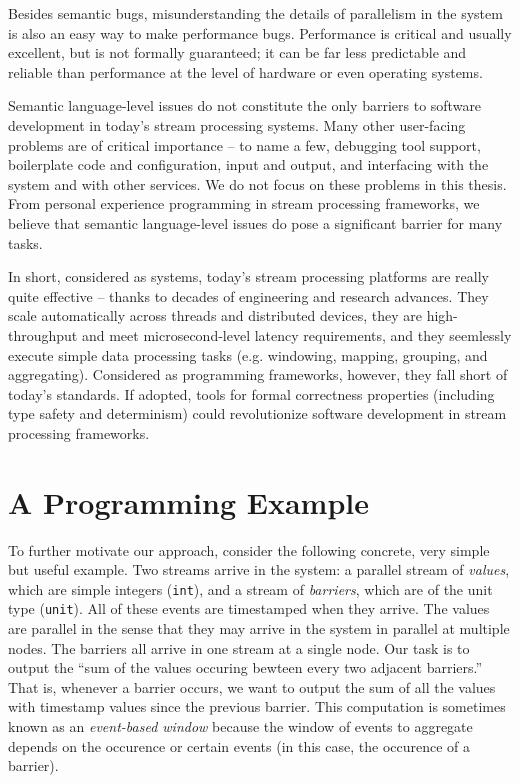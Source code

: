 Besides semantic bugs, misunderstanding the details of parallelism in the system is also an easy way to make performance bugs. Performance is critical and usually excellent, but is not formally guaranteed; it can be far less predictable and reliable than performance at the level of hardware or even operating systems.

Semantic language-level issues do not constitute the only barriers to software development in today's stream processing systems. Many other user-facing problems are of critical importance -- to name a few, debugging tool support, boilerplate code and configuration, input and output, and interfacing with the system and with other services. We do not focus on these problems in this thesis. From personal experience programming in stream processing frameworks, we believe that semantic language-level issues do pose a significant barrier for many tasks.

In short, considered as systems, today's stream processing platforms are really quite effective -- thanks to decades of engineering and research advances. They scale automatically across threads and distributed devices, they are high-throughput and meet microsecond-level latency requirements, and they seemlessly execute simple data processing tasks (e.g. windowing, mapping, grouping, and aggregating). Considered as programming frameworks, however, they fall short of today's standards. If adopted, tools for formal correctness properties (including type safety and determinism) could revolutionize software development in stream processing frameworks.

\section{A Programming Example}

To further motivate our approach, consider the following concrete, very simple but useful example.
Two streams arrive in the system: a parallel stream of \emph{values}, which are simple integers (\texttt{int}), and a stream of \emph{barriers}, which are of the unit type (\texttt{unit}).
All of these events are timestamped when they arrive.
The values are parallel in the sense that they may arrive in the system in parallel at multiple nodes.
The barriers all arrive in one stream at a single node.
Our task is to output the ``sum of the values occuring bewteen every two adjacent barriers.'' That is, whenever a barrier occurs, we want to output the sum of all the values with timestamp values since the previous barrier. This computation is sometimes known as an \emph{event-based window} because the window of events to aggregate depends on the occurence or certain events (in this case, the occurence of a barrier).

